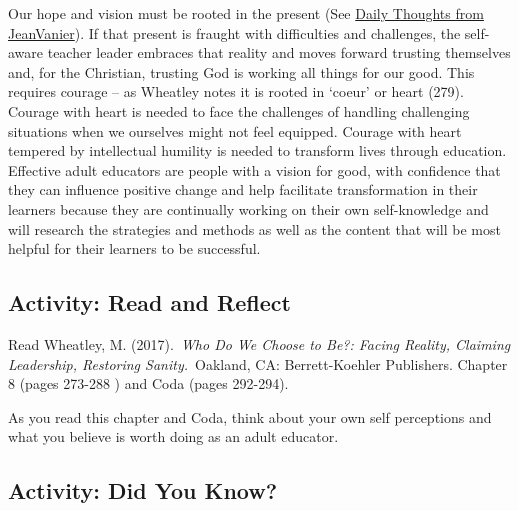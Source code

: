 \documentclass[
]{book}
\begin{document}
Our hope and vision must be rooted in the present (See \href{http://quotetab.com/quotes/by-jean-vanier}{Daily Thoughts from JeanVanier}). If that present is fraught with difficulties and challenges, the self-aware teacher leader embraces that reality and moves forward trusting themselves and, for the Christian, trusting God is working all things for our good. This requires courage -- as Wheatley notes it is rooted in `coeur' or heart (279). Courage with heart is needed to face the challenges of handling challenging situations when we ourselves might not feel equipped. Courage with heart tempered by intellectual humility is needed to transform lives through education. Effective adult educators are people with a vision for good, with confidence that they can influence positive change and help facilitate transformation in their learners because they are continually working on their own self-knowledge and will research the strategies and methods as well as the content that will be most helpful for their learners to be successful.

\hypertarget{activity-read-and-reflect}{%
\subsection{Activity: Read and Reflect}\label{activity-read-and-reflect}}

\begin{reflect}
Read Wheatley, M. (2017).~\emph{Who Do We Choose to Be?: Facing Reality,
Claiming Leadership, Restoring Sanity.}~Oakland, CA: Berrett-Koehler
Publishers. Chapter 8 (pages 273-288 ) and Coda (pages 292-294).

As you read this chapter and Coda, think about your own self perceptions
and what you believe is worth doing as an adult educator.
\end{reflect}

\hypertarget{activity-did-you-know}{%
\subsection{Activity: Did You Know?}\label{activity-did-you-know}}
\end{document}

